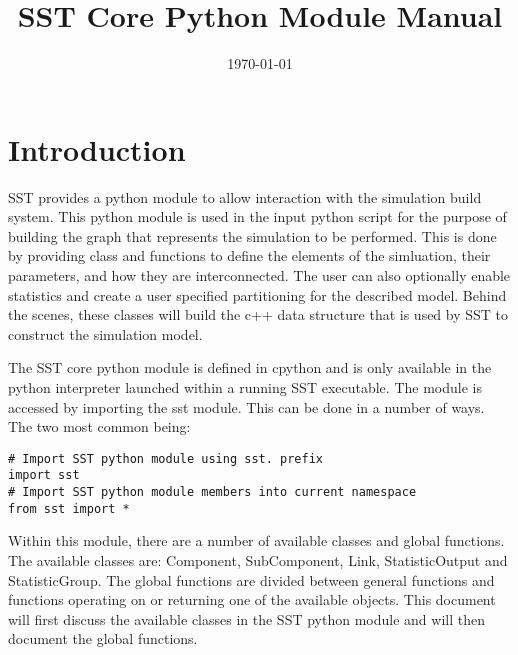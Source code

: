 \documentclass[11pt,letterpaper]{report}
\title{SST Core Python Module Manual}
\date{\today}
\begin{document}
\maketitle
\newpage


{}

\chapter{Introduction}

SST provides a python module to allow interaction with the simulation
build system.  This python module is used in the input python script
for the purpose of building the graph that represents the simulation
to be performed.  This is done by providing class and functions to
define the elements of the simluation, their parameters, and how they
are interconnected.  The user can also optionally enable statistics
and create a user specified partitioning for the described model.
Behind the scenes, these classes will build the c++ data structure
that is used by SST to construct the simulation model.

The SST core python module is defined in cpython and is only
available in the python interpreter launched within a running SST
executable.  The module is accessed by importing the sst module.  This
can be done in a number of ways.  The two most common being:

\begin{lstlisting}
# Import SST python module using sst. prefix
import sst
# Import SST python module members into current namespace
from sst import *
\end{lstlisting}

Within this module, there are a number of available classes and global
functions.  The available classes are: Component, SubComponent, Link,
StatisticOutput and StatisticGroup.  The global functions are divided
between general functions and functions operating on or returning one
of the available objects.  This document will first discuss the
available classes in the SST python module and will then document the
global functions.





\end{document}
